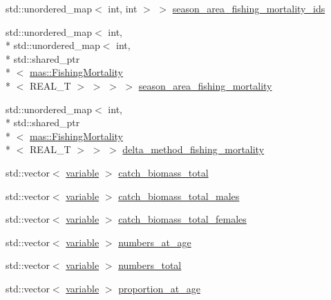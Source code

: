 \begin{DoxyCompactItemize}
std\-::unordered\-\_\-map$<$ int, int $>$ $>$ \hyperlink{structmas_1_1_fleet_acab7b946bf0d12476d4167f9d35693e8}{season\-\_\-area\-\_\-fishing\-\_\-mortality\-\_\-ids}
\item 
std\-::unordered\-\_\-map$<$ int, \\*
std\-::unordered\-\_\-map$<$ int, \\*
std\-::shared\-\_\-ptr\\*
$<$ \hyperlink{structmas_1_1_fishing_mortality}{mas\-::\-Fishing\-Mortality}\\*
$<$ R\-E\-A\-L\-\_\-\-T $>$ $>$ $>$ $>$ \hyperlink{structmas_1_1_fleet_a2eba2d477fe351f44a1c22f51f75018f}{season\-\_\-area\-\_\-fishing\-\_\-mortality}
\item 
std\-::unordered\-\_\-map$<$ int, \\*
std\-::shared\-\_\-ptr\\*
$<$ \hyperlink{structmas_1_1_fishing_mortality}{mas\-::\-Fishing\-Mortality}\\*
$<$ R\-E\-A\-L\-\_\-\-T $>$ $>$ $>$ \hyperlink{structmas_1_1_fleet_afd6e03157a9ad766993a41d4eb61124c}{delta\-\_\-method\-\_\-fishing\-\_\-mortality}
\item 
std\-::vector$<$ \hyperlink{structmas_1_1_fleet_a1902d0842cb7ce9b9bdd4be013e709a9}{variable} $>$ \hyperlink{structmas_1_1_fleet_aec96c786b81fb4cf0d908de0297cc2f4}{catch\-\_\-biomass\-\_\-total}
\item 
std\-::vector$<$ \hyperlink{structmas_1_1_fleet_a1902d0842cb7ce9b9bdd4be013e709a9}{variable} $>$ \hyperlink{structmas_1_1_fleet_a9ff1f7b831b4297a0241ce24f83b9e0f}{catch\-\_\-biomass\-\_\-total\-\_\-males}
\item 
std\-::vector$<$ \hyperlink{structmas_1_1_fleet_a1902d0842cb7ce9b9bdd4be013e709a9}{variable} $>$ \hyperlink{structmas_1_1_fleet_a25f8a76ca51ac7bf920d94d8d3c122c7}{catch\-\_\-biomass\-\_\-total\-\_\-females}
\item 
std\-::vector$<$ \hyperlink{structmas_1_1_fleet_a1902d0842cb7ce9b9bdd4be013e709a9}{variable} $>$ \hyperlink{structmas_1_1_fleet_a1f88d8e497852415b1e4010f8ab4d18f}{numbers\-\_\-at\-\_\-age}
\item 
std\-::vector$<$ \hyperlink{structmas_1_1_fleet_a1902d0842cb7ce9b9bdd4be013e709a9}{variable} $>$ \hyperlink{structmas_1_1_fleet_ad7457fd4d7e459925b87d50dc591b04c}{numbers\-\_\-total}
\item 
std\-::vector$<$ \hyperlink{structmas_1_1_fleet_a1902d0842cb7ce9b9bdd4be013e709a9}{variable} $>$ \hyperlink{structmas_1_1_fleet_a19e63403b6cc924ffbbf4876fdeb1cd0}{proportion\-\_\-at\-\_\-age}

\end{DoxyCompactItemize}
